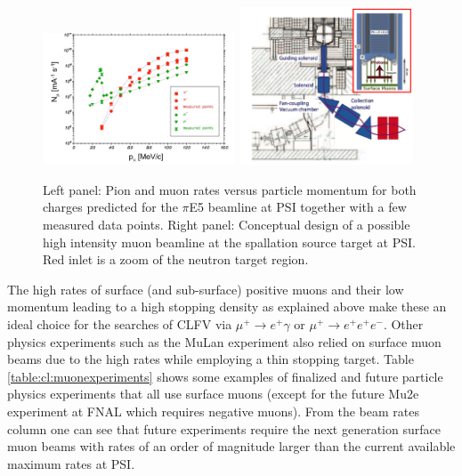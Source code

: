 \begin{figure}[ht]
\includegraphics[width=0.51\textwidth]{ChargedLeptons/Figures/MuonRates.pdf}\hfill
\includegraphics[width=0.46\textwidth]{ChargedLeptons/Figures/HIMB.pdf}
\caption{Left panel: Pion and muon rates versus particle momentum for both charges predicted for the $\pi$E5 beamline at PSI together with a few measured data points. Right panel: Conceptual design of a possible high intensity muon beamline at the spallation source target at PSI. Red inlet is a zoom of the neutron target region.\label{fig:cl:muonrates}}
\end{figure}

The high rates of surface (and sub-surface) positive muons and their low momentum leading to a high stopping density as explained above make these an ideal choice for the searches of CLFV via $\mu^+\to e^+ \gamma$ or $\mu^+ \to e^+ e^+ e^-$. Other physics experiments such as the MuLan experiment \cite{Tishchenko:2012ie} also relied on surface muon beams due to the high rates while employing a thin stopping target. Table \ref{table:cl:muonexperiments} shows some examples of finalized and future particle physics experiments that all use surface muons (except for the future Mu2e experiment at FNAL which requires negative muons). From the beam rates column one can see that future experiments require the next generation surface muon beams with rates of an order of magnitude larger than the current available maximum rates at PSI. 

